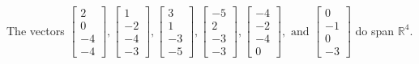 \begin{exercise}
\begin{exerciseStatement}
  \end{exerciseStatement}
  \begin{exerciseAnswer}
   The vectors \(\left[\begin{array}{r}
2 \\
0 \\
-4 \\
-4
\end{array}\right] , \left[\begin{array}{r}
1 \\
-2 \\
-4 \\
-3
\end{array}\right] , \left[\begin{array}{r}
3 \\
1 \\
-3 \\
-5
\end{array}\right] , \left[\begin{array}{r}
-5 \\
2 \\
-3 \\
-3
\end{array}\right] , \left[\begin{array}{r}
-4 \\
-2 \\
-4 \\
0
\end{array}\right] , \text{ and } \left[\begin{array}{r}
0 \\
-1 \\
0 \\
-3
\end{array}\right]\) 
  	 do  
	span \(\mathbb{R}^4\).
  


  \end{exerciseAnswer}
\end{exercise}